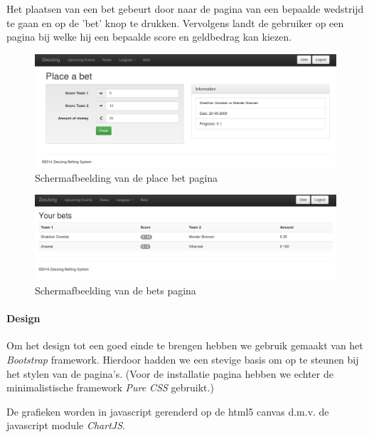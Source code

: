 \documentclass[11pt]{article}
\begin{document}
Het plaatsen van een bet gebeurt door naar de pagina van een bepaalde wedstrijd te gaan en op de 'bet' knop te drukken.  Vervolgens landt de gebruiker op een pagina bij welke hij een bepaalde score en geldbedrag kan kiezen.
\begin{figure}[h!]
	\begin{center}
	\includegraphics[scale=0.30]{placeBet.png}

	\caption{Schermafbeelding van de place bet pagina}
	\label{fig:placeBet}
	\end{center}
\end{figure}

\begin{figure}[h!]
	\begin{center}
	\includegraphics[scale=0.30]{bets.png}
	\caption{Schermafbeelding van de bets pagina}
	\label{fig:bets}
	\end{center}
\end{figure}





\paragraph{Design}
Om het design tot een goed einde te brengen hebben we gebruik gemaakt van het \emph{Bootstrap} 
framework. Hierdoor hadden we een stevige basis om op te steunen bij het stylen van de pagina's. (Voor de installatie pagina hebben we echter de minimalistische framework \emph{Pure CSS} gebruikt.)

De grafieken worden in javascript gerenderd op de html5 canvas d.m.v. de javascript module \emph{ChartJS}.
\end{document}

